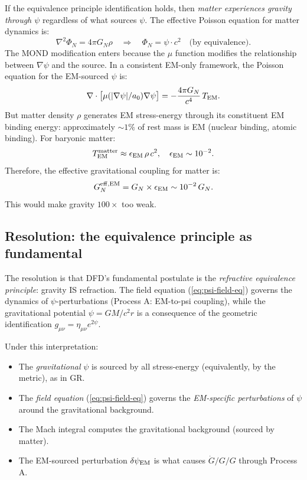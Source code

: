 \documentclass[11pt]{article}
\newcommand{\GN}{G_N}
\newcommand{\Gdot}{\dot{G}/G}
\newcommand{\mufd}{\mu}
\begin{document}
If the equivalence principle identification holds, then \emph{matter
experiences gravity through $\psi$} regardless of what sources $\psi$.
The effective Poisson equation for matter dynamics is:
\begin{equation}
  \nabla^2\Phi_N = 4\pi \GN\rho \quad\Rightarrow\quad
  \Phi_N = \psi\cdot c^2 \quad\text{(by equivalence)}.
\end{equation}
The MOND modification enters because the $\mufd$ function modifies the
relationship between $\nabla\psi$ and the source. In a consistent EM-only
framework, the Poisson equation for the EM-sourced $\psi$ is:
\begin{equation}\label{eq:Poisson-EM}
  \nabla\cdot\bigl[\mufd(|\nabla\psi|/a_0)\nabla\psi\bigr]
  = -\frac{4\pi \GN}{c^4}\,T_{\rm EM}.
\end{equation}
But matter density $\rho$ generates EM stress-energy through its
constituent EM binding energy: approximately $\sim 1\%$ of rest mass
is EM (nuclear binding, atomic binding). For baryonic matter:
\begin{equation}
  T_{\rm EM}^{\rm matter} \approx \epsilon_{\rm EM}\,\rho\,c^2,
  \quad \epsilon_{\rm EM} \sim 10^{-2}.
\end{equation}
Therefore, the effective gravitational coupling for matter is:
\begin{equation}
  \GN^{\rm eff,EM} = \GN\times\epsilon_{\rm EM} \sim 10^{-2}\,\GN.
\end{equation}
This would make gravity $100\times$ too weak.

\subsection{Resolution: the equivalence principle as fundamental}

The resolution is that DFD's fundamental postulate is the \emph{refractive
equivalence principle}: gravity IS refraction. The field equation
(\ref{eq:psi-field-eq}) governs the dynamics of $\psi$-perturbations
(Process A: EM-to-psi coupling), while the gravitational potential
$\psi = GM/c^2r$ is a consequence of the geometric identification
$g_{\mu\nu} = \eta_{\mu\nu}e^{2\psi}$.

Under this interpretation:
\begin{itemize}[nosep]
  \item The \emph{gravitational} $\psi$ is sourced by all stress-energy
    (equivalently, by the metric), as in GR.
  \item The \emph{field equation} (\ref{eq:psi-field-eq}) governs the
    \emph{EM-specific perturbations} of $\psi$ around the gravitational
    background.
  \item The Mach integral computes the gravitational background
    (sourced by matter).
  \item The EM-sourced perturbation $\delta\psi_{\rm EM}$ is what
    causes $\Gdot/G$ through Process A.
\end{itemize}
\end{document}
